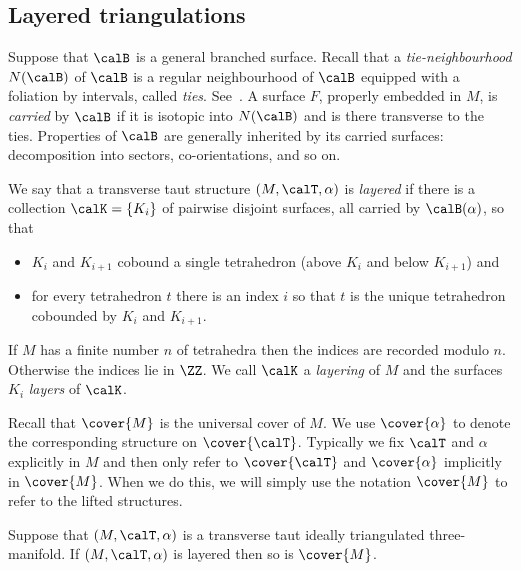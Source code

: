 \documentclass[12pt]{amsart}
\begin{document}
\subsection{Layered triangulations}

Suppose that $\calB$ is a general branched surface. Recall that a \emph{tie-neighbourhood} $N(\calB)$ of $\calB$ is a regular neighbourhood of $\calB$ equipped with a foliation by intervals, called \emph{ties}. See~\cite[Figure~1.2]{Mosher96}. A surface $F$, properly embedded in $M$, is \emph{carried} by $\calB$ if it is isotopic into $N(\calB)$ and is there transverse to the ties.  Properties of $\calB$ are generally inherited by its carried surfaces: decomposition into sectors, co-orientations, and so on. 

\begin{definition}
\label{Def:Layered}
We say that a transverse taut structure $(M, \calT, \alpha)$ is \emph{layered} if there is a collection $\calK = \{K_i\}$ of pairwise disjoint surfaces, all carried by $\calB(\alpha)$, so that
\begin{itemize}
\item 
$K_i$ and $K_{i+1}$ cobound a single tetrahedron (above $K_i$ and below $K_{i+1}$) and
\item 
for every tetrahedron $t$ there is an index $i$ so that $t$ is the unique tetrahedron cobounded by $K_i$ and $K_{i+1}$.
\end{itemize}
If $M$ has a finite number $n$ of tetrahedra then the indices are recorded modulo $n$.  Otherwise the indices lie in $\ZZ$.  We call $\calK$ a \emph{layering} of $M$ and the surfaces $K_i$ \emph{layers} of $\calK$. 
\end{definition}


Recall that $\cover{M}$ is the universal cover of $M$.  We use $\cover{\alpha}$ to denote the corresponding structure on $\cover{\calT}$.  Typically we fix $\calT$ and $\alpha$ explicitly in $M$ and then only refer to $\cover{\calT}$ and $\cover{\alpha}$ implicitly in $\cover{M}$.  When we do this, we will simply use the notation $\cover{M}$ to refer to the lifted structures.

\begin{lemma}
\label{Lem:LayeredImpliesLayered}
Suppose that $(M, \calT, \alpha)$ is a transverse taut ideally triangulated three-manifold.  
If $(M, \calT, \alpha)$ is layered then so is $\cover{M}$. 
\end{lemma}
\end{document}
